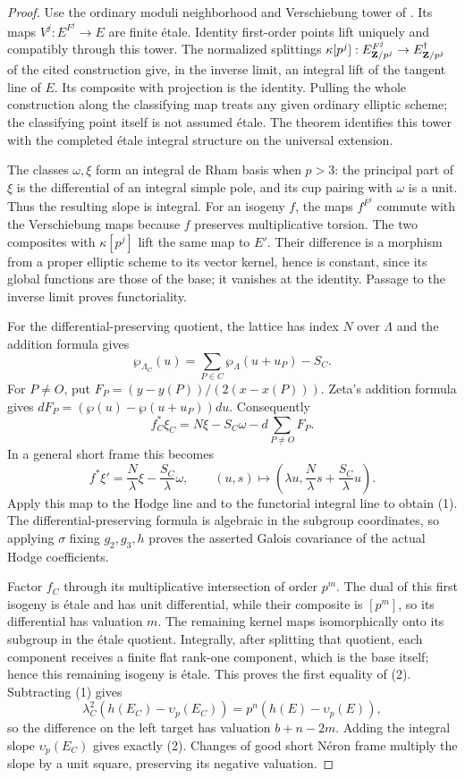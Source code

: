 \documentclass[11pt]{article}
\theoremstyle{definition}\newtheorem{definition}[theorem]{Definition}
\theoremstyle{remark}\newtheorem{remark}[theorem]{Remark}
\begin{document}
\begin{proof}
Use the ordinary moduli neighborhood and Verschiebung tower of \cite[\S2.2, pp.~16--19; Theorem 2.2, p.~18]{MochizukiConnections}. Its maps $V^j:E^{F^j}\to E$ are finite \'etale. Identity first-order points lift uniquely and compatibly through this tower. The normalized splittings
$\kappa[p^j]:E^{F^j}_{\mathbf Z/p^j}\to E^\dagger_{\mathbf Z/p^j}$ of the cited construction give, in the inverse limit, an integral lift of the tangent line of $E$. Its composite with projection is the identity. Pulling the whole construction along the classifying map treats any given ordinary elliptic scheme; the classifying point itself is not assumed \'etale. The theorem identifies this tower with the completed \'etale integral structure on the universal extension.

The classes $\omega,\xi$ form an integral de Rham basis when $p>3$: the principal part of $\xi$ is the differential of an integral simple pole, and its cup pairing with $\omega$ is a unit. Thus the resulting slope is integral. For an isogeny $f$, the maps $f^{F^j}$ commute with the Verschiebung maps because $f$ preserves multiplicative torsion. The two composites with $\kappa[p^j]$ lift the same map to $E'$. Their difference is a morphism from a proper elliptic scheme to its vector kernel, hence is constant, since its global functions are those of the base; it vanishes at the identity. Passage to the inverse limit proves functoriality.

For the differential-preserving quotient, the lattice has index $N$ over $\Lambda$ and the addition formula gives
\[
 \wp_{\Lambda_C}(u)=\sum_{P\in C}\wp_\Lambda(u+u_P)-S_C.
\]
For $P\ne O$, put $F_P=(y-y(P))/(2(x-x(P)))$. Zeta's addition formula gives
$dF_P=(\wp(u)-\wp(u+u_P))du$. Consequently
\[
 f_C^*\xi_C=N\xi-S_C\omega-d\sum_{P\ne O}F_P.
\]
In a general short frame this becomes
\[
 f^*\xi'=\frac N\lambda\xi-\frac{S_C}{\lambda}\omega,
 \qquad (u,s)\longmapsto
 \left(\lambda u,\frac N\lambda s+\frac{S_C}{\lambda}u\right).
\]
Apply this map to the Hodge line and to the functorial integral line to obtain (1). The differential-preserving formula is algebraic in the subgroup coordinates, so applying $\sigma$ fixing $g_2,g_3,h$ proves the asserted Galois covariance of the actual Hodge coefficients.

Factor $f_C$ through its multiplicative intersection of order $p^m$. The dual of this first isogeny is \'etale and has unit differential, while their composite is $[p^m]$, so its differential has valuation $m$. The remaining kernel maps isomorphically onto its subgroup in the \'etale quotient. Integrally, after splitting that quotient, each component receives a finite flat rank-one component, which is the base itself; hence this remaining isogeny is \'etale. This proves the first equality of (2). Subtracting (1) gives
\[
 \lambda_C^2(h(E_C)-\upsilon_p(E_C))
                   =p^n(h(E)-\upsilon_p(E)),
\]
so the difference on the left target has valuation $b+n-2m$. Adding the integral slope $\upsilon_p(E_C)$ gives exactly (2). Changes of good short N\'eron frame multiply the slope by a unit square, preserving its negative valuation.


\end{proof}
\end{document}
